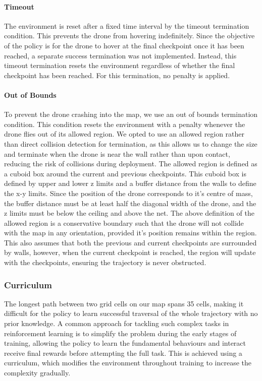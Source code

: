 \documentclass{report_template_oxford}
\begin{document}
\paragraph{Timeout} The environment is reset after a fixed time interval by the timeout termination condition. This prevents the drone from hovering indefinitely. Since the objective of the policy is for the drone to hover at the final checkpoint once it has been reached, a separate success termination was not implemented. Instead, this timeout termination resets the environment regardless of whether the final checkpoint has been reached. For this termination, no penalty is applied. 

\paragraph{Out of Bounds} To prevent the drone crashing into the map, we use an out of bounds termination condition. This condition resets the environment with a penalty whenever the drone flies out of its allowed region. We opted to use an allowed region rather than direct collision detection for termination, as this allows us to change the size and terminate when the drone is near the wall rather than upon contact, reducing the risk of collisions during deployment. The allowed region is defined as a cuboid box around the current and previous checkpoints. This cuboid box is defined by upper and lower z limits and a buffer distance from the walls to define the x-y limits. Since the position of the drone corresponds to it's centre of mass, the buffer distance must be at least half the diagonal width of the drone, and the z limits must be below the ceiling and above the net. The above definition of the allowed region is a conservative boundary such that the drone will not collide with the map in any orientation, provided it's position remains within the region. This also assumes that both the previous and current checkpoints are surrounded by walls, however, when the current checkpoint is reached, the region will update with the checkpoints, ensuring the trajectory is never obstructed.

\subsubsection{Curriculum} \label{RLCurriculum}
The longest path between two grid cells on our map spans 35 cells, making it difficult for the policy to learn successful traversal of the whole trajectory with no prior knowledge. A common approach for tackling such complex tasks in reinforcement learning is to simplify the problem during the early stages of training, allowing the policy to learn the fundamental behaviours and interact receive final rewards before attempting the full task. This is achieved using a curriculum, which modifies the environment throughout training to increase the complexity gradually.
\end{document}
